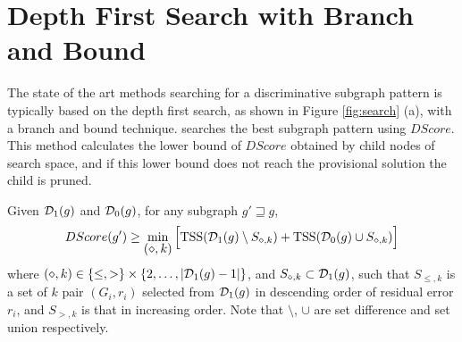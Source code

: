 \section{Depth First Search with Branch and Bound}
The state of the art methods \cite{Saigo:2009, Shirakawa:2018} 
searching for a discriminative subgraph pattern is typically based on the depth first search, 
as shown in Figure \ref{fig:search} (a), with a branch and bound technique.
\cite{Shirakawa:2018} searches the best subgraph pattern using $DScore$. 
This method calculates the lower bound of $DScore$ obtained by child nodes of search space, 
and if this lower bound does not reach the provisional solution the child is pruned.
\begin{comment}
\begin{theorem}
  \label{thm:bound_C}
  Given $\D_1(g)$ and $\D_0(g)$, for any subgraph $g' \sqsupseteq g$,
  \begin{multline}
    \label{eq:bound_C}
    CScore(g') \leq 
    \max \Big[ 2 \sum_{\{n | y_n=+1, \{G_{n}, y_{n}\} \in D_1(g)\}} y_n - \sum_{n=1}^{N}y_n, 
	-2 \sum_{\{n | y_n=-1, \{G_{n}, y_{n}\} \in D_1(g)\}} y_n + \sum_{n=1}^{N}y_n \Big]
  \end{multline}
\end{theorem}
\end{comment}

\begin{theorem}
  \label{thm:bound_R}
  Given $\mathcal{D}_1(g)$ and $\mathcal{D}_0(g)$, for any subgraph $g' \sqsupseteq g$,
  \begin{multline}
    \label{eq:bound_R}
    DScore(g') \geq 
    \mymin{(\diamond,k)} \Big[ \tss(\D_1(g) \setminus S_{\diamond, k}) + \tss(\D_0(g) \cup S_{\diamond, k}) \Big]
  \end{multline}
  where $ (\diamond, k) \in \{ \leq, > \} \times \{ 2, \dots, |\mathcal{D}_1(g) - 1| \} $,
  and $S_{\diamond, k} \subset \mathcal{D}_1(g)$, such that $S_{\leq, k}$ is
  a set of $k$ pair $(G_i, r_i)$ selected from $\mathcal{D}_1(g)$ in descending order of residual error $r_i$,
  and $S_{>, k}$ is that in increasing order.
  Note that $\setminus$, $\cup$ are set difference and set union respectively.
\end{theorem}

